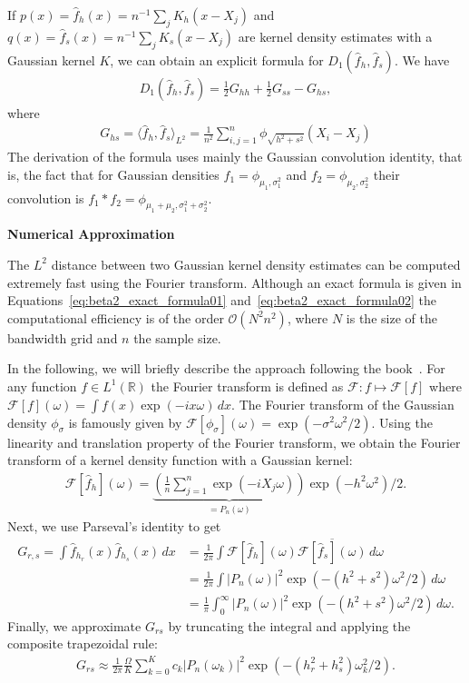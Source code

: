 If $p(x)=\hat{f}_h(x)=n^{-1}\sum_jK_h(x-X_j)$ and $q(x)=\hat{f}_s(x)=n^{-1}\sum_jK_s(x-X_j)$ are kernel density estimates with a Gaussian kernel $K$, we can obtain an explicit formula for $D_1(\hat{f}_h,\hat{f}_s)$. We have
\begin{align}\label{eq:beta2_exact_formula01}
    D_1(\hat{f}_h,\hat{f}_s)=\frac{1}{2}G_{hh}+\frac{1}{2}G_{ss}-G_{hs},
\end{align}
where
\begin{align}\label{eq:beta2_exact_formula02}
    G_{hs}=\langle\hat{f}_{h},\hat{f}_s\rangle_{L^2}=\frac{1}{n^2}\sum_{i,j=1}^{n}\phi_{\sqrt{h^2+s^2}}\left(X_i-X_j\right)
\end{align}
The derivation of the formula uses mainly the Gaussian convolution identity, that is, the fact that for Gaussian densities $f_1=\phi_{\mu_1,\sigma_1^2}$ and $f_2=\phi_{\mu_2,\sigma_2^2}$ their convolution is $f_1\ast f_2=\phi_{\mu_1+\mu_2,\sigma_1^2+\sigma_2^2}$.

\textbf{Numerical Approximation}

The $L^2$ distance between two Gaussian kernel density estimates can be computed extremely fast using the Fourier transform. Although an exact formula is given in Equations~\eqref{eq:beta2_exact_formula01} and~\eqref{eq:beta2_exact_formula02} the computational efficiency is of the order $\mathcal{O}(N^2n^2)$, where $N$ is the size of the bandwidth grid and $n$ the sample size.

In the following, we will briefly describe the approach following the book~\cite{plonka_numerical_2018}. For any function $f\in L^1(\mathbb{R})$ the Fourier transform is defined as $\mathcal{F}:f\mapsto\mathcal{F}[f]$ where $\mathcal{F}[f](\omega)=\int f(x)\exp{(-ix\omega)}\,dx$. The Fourier transform of the Gaussian density $\phi_{\sigma}$ is famously given by $\mathcal{F}[\phi_{\sigma}](\omega)=\exp{(-\sigma^2\omega^2/2)}$. Using the linearity and translation property of the Fourier transform, we obtain the Fourier transform of a kernel density function with a Gaussian kernel:
\begin{align*}
    \mathcal{F}[\hat{f}_h](\omega)=\underbrace{\left(\frac{1}{n}\sum_{j=1}^{n}\exp{(-iX_j\omega)}\right)}_{=P_n(\omega)}\exp{(-h^2\omega^2)/2}.
\end{align*}
Next, we use Parseval's identity to get
\begin{align*}
    G_{r,s}=\int\hat{f}_{h_r}(x)\hat{f}_{h_s}(x)\,dx&=\frac{1}{2\pi}\int\mathcal{F}[\hat{f}_h](\omega)\overline{\mathcal{F}[\hat{f}_s](\omega)}\,d\omega\\&
    =\frac{1}{2\pi}\int|P_n(\omega)|^2\exp{(-(h^2+s^2)\omega^2/2)}\,d\omega\\&
    =\frac{1}{\pi}\int_0^{\infty}|P_n(\omega)|^2\exp{(-(h^2+s^2)\omega^2/2)}\,d\omega.
\end{align*}
Finally, we approximate $G_{rs}$ by truncating the integral and applying the composite trapezoidal rule:
\begin{align*}
    G_{rs}\approx\frac{1}{2\pi}\frac{\Omega}{K}\sum_{k=0}^{K}c_k|P_n(\omega_k)|^2\exp{(-(h_r^2+h_s^2)\omega_k^2/2)}.
\end{align*}

